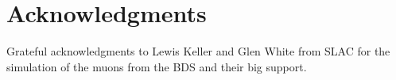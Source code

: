 \documentclass[12pt]{article}
\begin{document}





\section*{Acknowledgments}
Grateful acknowledgments to Lewis Keller and Glen White from SLAC for the simulation of the muons from the BDS and their big support.

%




\end{document}
